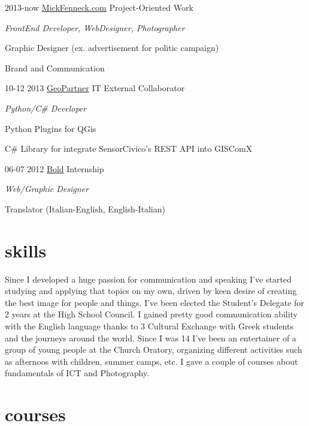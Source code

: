 \documentclass[]{friggeri-cv}
\begin{document}
\begin{entrylist}
  \entry
    {2013-now}
    {\href{http://www.mickfenneck.com}{MickFenneck.com}}
    {Project-Oriented Work}
    {\emph{FrontEnd Developer, WebDesigner, Photographer}

	{Graphic Designer (ex. advertisement for politic campaign)}

	{Brand and Communication}
    }
\entry
    {10-12 2013}
    {\href{http://www.geopartner.it}{GeoPartner}}
    {IT External Collaborator}
    {\emph{Python/C\# Developer}

	{Python Plugins for QGis}
	
	{C\# Library for integrate SensorCivico's REST API into GISComX}
    }
\entry
    {06-07 2012}
    {\href{http://www.studiobold.it}{Bold}}
    {Internship}
    {\emph{Web/Graphic Designer}

	{Translator (Italian-English, English-Italian)}
    }
\end{entrylist}

\section{skills}

Since I developed a huge passion for communication and speaking I've started studying and applying that topics on my own, driven by keen desire of creating the best image for people and things. I've been elected the Student's Delegate for 2 years at the High School Council. I gained pretty good communication ability with the English language thanks to 3 Cultural Exchange with Greek students and the journeys around the world. Since I was 14 I've been an entertainer of a group of young people at the Church Oratory, organizing different activities such as afternoos with children, summer camps, etc. I gave a couple of courses about fundamentals of ICT and Photography.

\section{courses}
\end{document}
